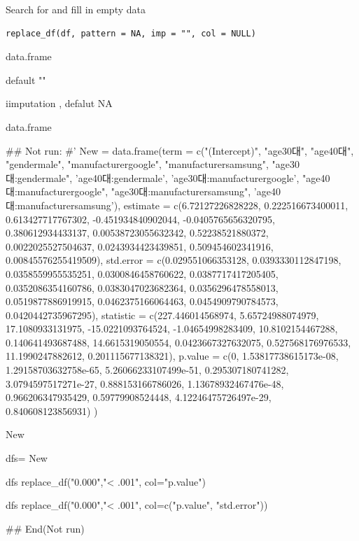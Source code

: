 \documentclass[a4paper]{book}
\begin{document}
%
\begin{Description}
Search for and fill in empty data
\end{Description}
%
\begin{Usage}
\begin{verbatim}
replace_df(df, pattern = NA, imp = "", col = NULL)
\end{verbatim}
\end{Usage}
%
\begin{Arguments}
\begin{ldescription}
\item[\code{df}] data.frame

\item[\code{pattern}] default ""

\item[\code{imp}] iimputation , defalut NA
\end{ldescription}
\end{Arguments}
%
\begin{Value}
data.frame
\end{Value}
%
\begin{Examples}
\begin{ExampleCode}

\#\# Not run: 
#'
New = data.frame(term = c("(Intercept)", "age30대",
 "age40대", "gendermale", "manufacturergoogle",
 "manufacturersamsung",
 "age30대:gendermale", 'age40대:gendermale',
  'age30대:manufacturergoogle', "age40대:manufacturergoogle",
  "age30대:manufacturersamsung", 'age40대:manufacturersamsung'),
estimate = c(6.72127226828228, 0.222516673400011, 0.613427717767302,
 -0.451934840902044, -0.0405765656320795, 0.380612934433137,
  0.00538723055632342, 0.52238521880372, 0.0022025527504637,
  0.0243934423439851, 0.509454602341916, 0.00845576255419509),
std.error = c(0.029551066353128, 0.0393330112847198,
0.0358559955535251, 0.0300846458760622, 0.0387717417205405,
 0.0352086354160786, 0.0383047023682364, 0.0356296478558013,
 0.0519877886919915, 0.0462375166064463,
 0.0454909790784573, 0.0420442735967295),
statistic = c(227.446014568974, 5.65724988074979,
 17.1080933131975, -15.0221093764524, -1.04654998283409,
 10.8102154467288, 0.140641493687488, 14.6615319050554,
  0.0423667327632075, 0.527568176976533,
   11.1990247882612, 0.201115677138321),
p.value = c(0, 1.53817738615173e-08, 1.29158703632758e-65,
5.26066233107499e-51, 0.295307180741282, 3.0794597517271e-27,
 0.888153166786026, 1.13678932467476e-48,
 0.966206347935429, 0.59779908524448,
 4.12246475726497e-29, 0.840608123856931)
)%

New

dfs= New%

dfs%
  replace_df("0.000","< .001", col="p.value")

dfs%
  replace_df("0.000","< .001", col=c("p.value", "std.error"))



## End(Not run)


\end{ExampleCode}
\end{Examples}
\end{document}
